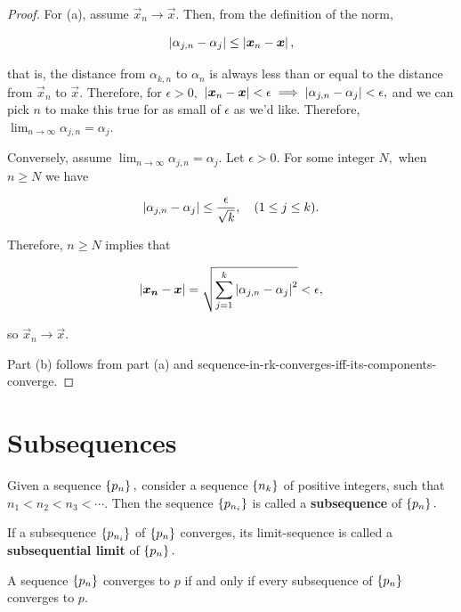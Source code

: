 \documentclass{article}
\begin{document}
\begin{proof}
For (a), assume $\vec x_{n} \to \vec x.$ Then, from the definition of the \@{norm},

\[ \left| \alpha_{j,n} - \alpha_j \right| \leq \left| \boldsymbol{x}_n - \boldsymbol{x} \right|, \]

that is, the distance from $\alpha_{k,n}$ to $\alpha_{n}$ is always less than or equal to the distance from $\vec{x}_n$ to $\vec{x}.$ Therefore, for $\epsilon > 0,$ $\left| \boldsymbol{x}_n - \boldsymbol{x} \right| < \epsilon \implies \left| \alpha_{j,n} - \alpha_j \right| < \epsilon,$ and we can pick $n$ to make this true for as small of $\epsilon$ as we'd like. Therefore, $\lim_{n \to \infty} \alpha_{j, n} = \alpha_j.$

Conversely, assume $\lim_{n \to \infty} \alpha_{j, n} = \alpha_j.$ Let $\epsilon > 0.$ For some \@{integer} $N,$ when $n \geq N$ we have

\[ \left| \alpha_{j,n} - \alpha_{j} \right| \leq \frac{\epsilon}{\sqrt{k}}, \quad (1 \leq j \leq k). \]

Therefore, $n \geq N$ implies that

\[ \left| \boldsymbol{x_n} - \boldsymbol{x} \right| = \sqrt{\sum_{j=1}^k \left| \alpha_{j,n} - \alpha_j \right|^2} < \epsilon, \]

so $\vec{x}_n \to \vec{x}. $

Part (b) follows from part (a) and \@{sequence-in-rk-converges-iff-its-components-converge}.
\end{proof}

\section{Subsequences}

\begin{definition}[Subsequence]
Given a \@{sequence} $\left\{ p_n \right\},$ consider a \@{sequence} $\left\{ n_k \right\}$ of positive integers, such that $n_1 < n_2 < n_3 < \cdots.$ Then the \@{sequence} $\left\{ p_{n_i} \right\}$ is called a \textbf{subsequence} of $\left\{ p_n \right\}.$
\end{definition}

\begin{definition}
If a subsequence $\left\{ p_{n_i} \right\}$ of $\left\{ p_n \right\}$ \@{converges}, its \@{limit-sequence} is called a \textbf{subsequential limit} of $\left\{ p_n \right\}.$
\end{definition}

\begin{theorem}
A sequence $\left\{ p_n \right\}$ \@{converges} to $p$ if and only if every \@{subsequence} of $\left\{ p_n \right\}$ converges to $p.$
\end{theorem}
\end{document}

